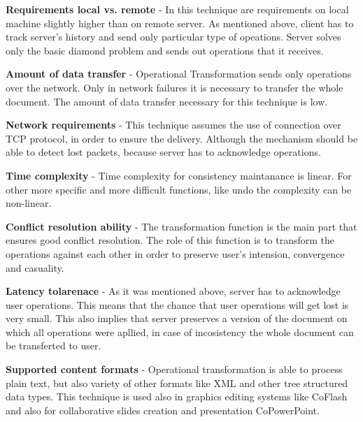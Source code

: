\documentclass[12pt,oneside]{fithesis2}
\begin{document}
\vspace{3mm}

\textbf{Requirements local vs. remote} - In this technique are requirements on local machine slightly higher than on remote server. As mentioned above, client has to track server's history and send only particular type of opeations. Server solves only the basic diamond problem and sends out operations that it receives.

\vspace{3mm}

\textbf{Amount of data transfer} - Operational Transformation sends only operations over the network. Only in network failures it is necessary to transfer the whole document. The amount of data transfer necessary for this technique is low.

\vspace{3mm}

\textbf{Network requirements} - This technique assumes the use of connection over TCP protocol\cite{Jupiter}\cite{simplified}, in order to ensure the delivery. Although the mechanism should be able to detect lost packets, because server has to acknowledge operations.

\vspace{3mm}

\textbf{Time complexity} - Time complexity for consistency maintanance is linear.\cite{sequence}\cite{orthogonal} For other more specific and more difficult functions, like undo the complexity can be non-linear.

\vspace{3mm}

\textbf{Conflict resolution ability} - The transformation function is the main part that ensures good conflict resolution. The role of this function is to transform the operations against each other in order to preserve user's intension, convergence and casuality.

\vspace{3mm}

\textbf{Latency tolarenace} - As it was mentioned above, server has to acknowledge user operations. This means that the chance that user operations will get lost is very small. This also implies that server preserves a version of the document on which all operations were apllied, in case of incosistency the whole document can be transferted to user.

\vspace{3mm}

\textbf{Supported content formats} - Operational transformation is able to process plain text, but also variety of other formats like XML and other tree structured data types. This technique is used also in graphics editing systems\cite{graphics} like CoFlash and also for collaborative slides creation and presentation CoPowerPoint.
\end{document}

